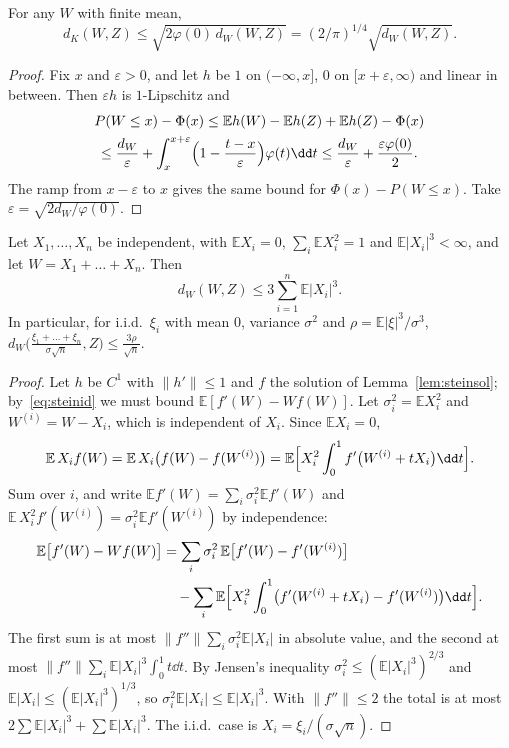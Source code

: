 \begin{proposition}\label{prop:dkdw}
For any $W$ with finite mean,
\[
d_K(W,Z)\le\sqrt{2\varphi(0)\,d_W(W,Z)}=(2/\pi)^{1/4}\sqrt{d_W(W,Z)}.
\]
\end{proposition}
\begin{proof}
Fix $x$ and $\varepsilon>0$, and let $h$ be $1$ on $(-\infty,x]$, $0$ on $[x+\varepsilon,\infty)$ and linear in between. Then $\varepsilon h$ is $1$-Lipschitz and
\[
\begin{gathered}
P(W\le x)-\Phi(x)\le\mathbb Eh(W)-\mathbb Eh(Z)+\mathbb Eh(Z)-\Phi(x)\\\le\frac{d_W}\varepsilon+\int_x^{x+\varepsilon}\Bigl(1-\frac{t-x}\varepsilon\Bigr)\varphi(t)\dd t
\le\frac{d_W}\varepsilon+\frac{\varepsilon\varphi(0)}2.
\end{gathered}
\]
The ramp from $x-\varepsilon$ to $x$ gives the same bound for $\Phi(x)-P(W\le x)$. Take $\varepsilon=\sqrt{2d_W/\varphi(0)}$.
\end{proof}

\begin{theorem}\label{thm:steinclt}
Let $X_1,\dots,X_n$ be independent, with $\mathbb EX_i=0$, $\sum_i\mathbb EX_i^2=1$ and $\mathbb E|X_i|^3<\infty$, and let $W=X_1+\dots+X_n$. Then
\[
d_W(W,Z)\le3\sum_{i=1}^n\mathbb E|X_i|^3.
\]
In particular, for i.i.d.\ $\xi_i$ with mean $0$, variance $\sigma^2$ and $\rho=\mathbb E|\xi|^3/\sigma^3$,
$d_W\bigl(\frac{\xi_1+\dots+\xi_n}{\sigma\sqrt n},Z\bigr)\le\frac{3\rho}{\sqrt n}$.
\end{theorem}
\begin{proof}
Let $h$ be $C^1$ with $\|h'\|\le1$ and $f$ the solution of Lemma~\ref{lem:steinsol}; by~\eqref{eq:steinid} we must bound $\mathbb E[f'(W)-Wf(W)]$. Let
$\sigma_i^2=\mathbb EX_i^2$ and $W^{(i)}=W-X_i$, which is independent of $X_i$. Since $\mathbb EX_i=0$,
\[
\mathbb E\,X_if(W)=\mathbb E\,X_i\bigl(f(W)-f(W^{(i)})\bigr)=\mathbb E\Bigl[X_i^2\int_0^1f'\bigl(W^{(i)}+tX_i\bigr)\dd t\Bigr].
\]
Sum over $i$, and write $\mathbb Ef'(W)=\sum_i\sigma_i^2\mathbb Ef'(W)$ and $\mathbb E\,X_i^2f'(W^{(i)})=\sigma_i^2\mathbb Ef'(W^{(i)})$ by independence:
\[
\begin{aligned}
\mathbb E\bigl[f'(W)-Wf(W)\bigr]&=\sum_i\sigma_i^2\,\mathbb E\bigl[f'(W)-f'(W^{(i)})\bigr]\\
&\quad-\sum_i\mathbb E\Bigl[X_i^2\int_0^1\bigl(f'(W^{(i)}+tX_i)-f'(W^{(i)})\bigr)\dd t\Bigr].
\end{aligned}
\]
The first sum is at most $\|f''\|\sum_i\sigma_i^2\mathbb E|X_i|$ in absolute value, and the second at most $\|f''\|\sum_i\mathbb E|X_i|^3\int_0^1t\dd t$. By
Jensen's inequality $\sigma_i^2\le(\mathbb E|X_i|^3)^{2/3}$ and $\mathbb E|X_i|\le(\mathbb E|X_i|^3)^{1/3}$, so $\sigma_i^2\mathbb E|X_i|\le\mathbb E|X_i|^3$. With $\|f''\|\le2$
the total is at most $2\sum\mathbb E|X_i|^3+\sum\mathbb E|X_i|^3$. The i.i.d.\ case is $X_i=\xi_i/(\sigma\sqrt n)$.
\end{proof}

